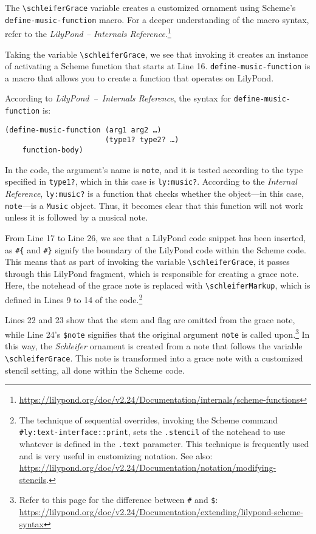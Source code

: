 The \verb|\schleiferGrace| variable creates a customized ornament using Scheme's \verb|define-music-function| macro. For a deeper understanding of the macro syntax, refer to the \textit{LilyPond – Internals Reference}.\footnote{\url{https://lilypond.org/doc/v2.24/Documentation/internals/scheme-functions}} \par
Taking the variable \verb|\schleiferGrace|, we see that invoking it creates an instance of activating a Scheme function that starts at Line 16. \verb|define-music-function| is a macro that allows you to create a function that operates on LilyPond. \par
According to \textit{LilyPond – Internals Reference}, the syntax for \verb|define-music-function| is: \par
\begin{verbatim}
(define-music-function (arg1 arg2 …)
                       (type1? type2? …)
    function-body)
\end{verbatim}

In the code, the argument's name is \verb|note|, and it is tested according to the type specified in \verb|type1?|, which in this case is \verb|ly:music?|. According to the \textit{Internal Reference}, \verb|ly:music?| is a function that checks whether the object—in this case, \verb|note|—is a \verb|Music| object. Thus, it becomes clear that this function will not work unless it is followed by a musical note. 

From Line 17 to Line 26, we see that a LilyPond code snippet has been inserted, as \verb+#{+ and \verb+#}+ signify the boundary of the LilyPond code within the Scheme code. This means that as part of invoking the variable \verb|\schleiferGrace|, it passes through this LilyPond fragment, which is responsible for creating a grace note. Here, the notehead of the grace note is replaced with \verb|\schleiferMarkup|, which is defined in Lines 9 to 14 of the code.\footnote{The technique of sequential overrides, invoking the Scheme command \verb+#ly:text-interface::print+, sets the \verb|.stencil| of the notehead to use whatever is defined in the \verb|.text| parameter. This technique is frequently used and is very useful in customizing notation. See also: \url{https://lilypond.org/doc/v2.24/Documentation/notation/modifying-stencils}.} 

Lines 22 and 23 show that the stem and flag are omitted from the grace note, while Line 24's \verb+$note+ signifies that the original argument \verb|note| is called upon.\footnote{Refer to this page for the difference between \verb+#+ and \verb+$+: \url{https://lilypond.org/doc/v2.24/Documentation/extending/lilypond-scheme-syntax}} In this way, the \textit{Schleifer} ornament is created from a note that follows the variable \verb|\schleiferGrace|. This note is transformed into a grace note with a customized stencil setting, all done within the Scheme code. 

